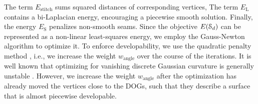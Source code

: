 %
The term $E_\text{stitch}$ sums squared distances of corresponding vertices, 
The term $E_\text{L}$ contains a bi-Laplacian energy, encouraging a piecewise smooth solution. 
%
Finally, the energy $E_\text{S}$ penalizes non-smooth seams. 
%
Since the objective $E(\mathcal{S}_d)$ can be represented as a non-linear least-squares energy, we employ the Gauss-Newton algorithm to optimize it. To enforce developability, we use the quadratic penalty method \cite{nocedal2006numerical}, i.e., we increase the weight $w_\text{angle}$ over the course of the iterations.
%
It is well known that optimizing for vanishing discrete Gaussian curvature is generally unstable \cite{stein_dev,zhao2006triangular}. However, we increase the weight $w_\text{angle}$ after the optimization has already moved the vertices close to the DOGs, such that they describe a surface that is almost piecewise developable.